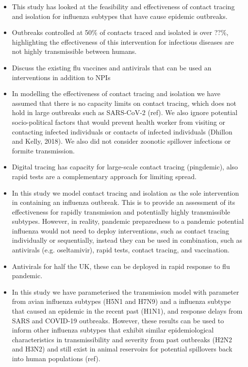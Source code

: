 \documentclass{article}
\begin{document}
\begin{itemize}
\item This study has looked at the feasibility and effectiveness of contact tracing and isolation for influenza subtypes that have cause epidemic outbreaks.
\item Outbreaks controlled at 50\% of contacts traced and isolated is over ??\%, highlighting the effectiveness of this intervention for infectious diseases are not highly transmissible between humans.
\item Discuss the existing flu vaccines and antivirals that can be used an interventions in addition to NPIs
\item In modelling the effectiveness of contact tracing and isolation we have assumed that there is no capacity limits on contact tracing, which does not hold in large outbreaks such as SARS-CoV-2 (ref). We also ignore potential socio-political factors that would prevent health worker from visiting or contacting infected individuals or contacts of infected individuals (Dhillon and Kelly, 2018). We also did not consider zoonotic spillover infections or formite transmission.
\item Digital tracing has capacity for large-scale contact tracing (pingdemic), also rapid tests are a complementary approach for limiting spread.
\item In this study we model contact tracing and isolation as the sole intervention in containing an influenza outbreak. This is to provide an assessment of its effectiveness for rapidly transmission and potentially highly transmissible subtypes. However, in reality, pandemic preparedness to a pandemic potential influenza would not need to deploy interventions, such as contact tracing individually or sequentially, instead they can be used in combination, such as antivirals (e.g. oseltamivir), rapid tests, contact tracing, and vaccination.
\item Antivirals for half the UK, these can be deployed in rapid response to flu pandemic.
\item In this study we have parameterised the transmission model with parameter from avian influenza subtypes (H5N1 and H7N9) and a influenza subtype that caused an epidemic in the recent past (H1N1), and response delays from SARS and COVID-19 outbreaks. However, these results can be used to inform other influenza subtypes that exhibit similar epidemiological characteristics in transmissibility and severity from past outbreaks (H2N2 and H3N2) and still exist in animal reservoirs for potential spillovers back into human populations (ref).

\end{itemize}
\end{document}
